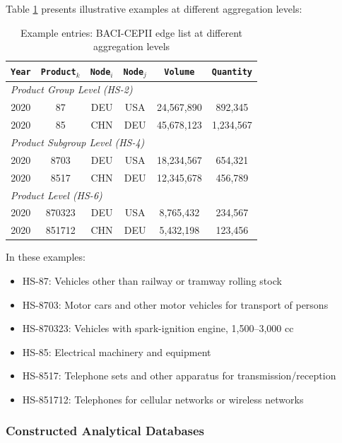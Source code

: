 \documentclass[preprint, 3p,
authoryear]{elsarticle} %
\begin{document}
Table \ref{tab:baci_example} presents illustrative examples at different
aggregation levels:

\begin{table}[ht]
\centering
\caption{Example entries:  BACI-CEPII edge list at different aggregation levels}
\label{tab:baci_example}
\begin{tabular}{@{}cccccc@{}}
\toprule
\texttt{Year} & \texttt{Product$_k$} & \texttt{Node$_i$} & \texttt{Node$_j$} & \texttt{Volume} & \texttt{Quantity} \\
\midrule
\multicolumn{6}{l}{\textit{Product Group Level (HS-2)}} \\
2020 & 87 & DEU & USA & 24,567,890 & 892,345 \\
2020 & 85 & CHN & DEU & 45,678,123 & 1,234,567 \\
\midrule
\multicolumn{6}{l}{\textit{Product Subgroup Level (HS-4)}} \\
2020 & 8703 & DEU & USA & 18,234,567 & 654,321 \\
2020 & 8517 & CHN & DEU & 12,345,678 & 456,789 \\
\midrule
\multicolumn{6}{l}{\textit{Product Level (HS-6)}} \\
2020 & 870323 & DEU & USA & 8,765,432 & 234,567 \\
2020 & 851712 & CHN & DEU & 5,432,198 & 123,456 \\
\bottomrule
\end{tabular}
\end{table}

\noindent In these examples:

\begin{itemize}
    \item HS-87: Vehicles other than railway or tramway rolling stock
    \item HS-8703: Motor cars and other motor vehicles for transport of persons
    \item HS-870323: Vehicles with spark-ignition engine, 1,500--3,000 cc
    \item HS-85: Electrical machinery and equipment
    \item HS-8517: Telephone sets and other apparatus for transmission/reception
    \item HS-851712: Telephones for cellular networks or wireless networks
\end{itemize}

\subsubsection{Constructed Analytical
Databases}\label{sec:constructed_databases}
\end{document}
